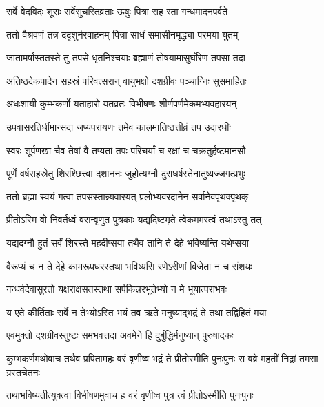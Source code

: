 \twolineshloka
{सर्वे वेदविदः शूराः सर्वेसुचरितव्रताः}
{ऊषुः पित्रा सह रता गन्धमादनपर्वते}


\twolineshloka
{ततो वैश्रवणं तत्र ददृशुर्नरवाहनम्}
{पित्रा सार्धं समासीनमृद्ध्या परमया युतम्}


\twolineshloka
{जातामर्षास्ततस्ते तु तपसे धृतनिश्चयाः}
{ब्रह्माणं तोषयामासुर्घोरेण तपसा तदा}


\twolineshloka
{अतिष्ठदेकपादेन सहस्रं परिवत्सरान्}
{वायुभक्षो दशग्रीवः पञ्चाग्निः सुसमाहितः}


\twolineshloka
{अधःशायी कुम्भकर्णो यताहारो यतव्रतः}
{विभीषणः शीर्णपर्णमेकमभ्यवहारयन्}


\twolineshloka
{उपवासरतिर्धीमान्सदा जप्यपरायणः}
{तमेव कालमातिष्ठत्तीव्रं तप उदारधीः}


\twolineshloka
{स्वरः शूर्पणखा चैव तेषां वै तप्यतां तपः}
{परिचर्यां च रक्षां च चक्रतुर्हष्टमानसौ}


\twolineshloka
{पूर्णे वर्षसहस्रेतु शिरश्छित्त्वा दशाननः}
{जुहोत्यग्नौ दुराधर्षस्तेनातुष्यज्जगत्प्रभुः}


\twolineshloka
{ततो ब्रह्मा स्वयं गत्वा तपसस्तान्न्यवारयत्}
{प्रलोभ्यवरदानेन सर्वानेवपृथक्पृथक्}



\twolineshloka
{प्रीतोऽस्मि वो निवर्तध्वं वरान्वृणुत पुत्रकाः}
{यद्यदिष्टमृते त्वेकममरत्वं तथाऽस्तु तत्}


\twolineshloka
{यद्यदग्नौ हुतं सर्वं शिरस्ते महदीप्सया}
{तथैव तानि ते देहे भविष्यन्ति यथेप्सया}


\twolineshloka
{वैरूप्यं च न ते देहे कामरूपधरस्तथा}
{भविष्यसि रणेऽरीणां विजेता न च संशयः}



\twolineshloka
{गन्धर्वदेवासुरतो यक्षराक्षसतस्तथा}
{सर्पकिन्नरभूतेभ्यो न मे भूयात्पराभवः}



\twolineshloka
{य एते कीर्तिताः सर्वे न तेभ्योऽस्ति भयं तव}
{ऋते मनुष्याद्भद्रं ते तथा तद्विहितं मया}



\twolineshloka
{एवमुक्तो दशग्रीवस्तुष्टः समभवत्तदा}
{अवमेने हि दुर्बुद्धिर्मनुष्यान् पुरुषादकः}


\threelineshloka
{कुम्भकर्णमथोवाच तथैव प्रपितामहः}
{वरं वृणीष्व भद्रं ते प्रीतोस्मीति पुनःपुनः}
{स वव्रे महतीं निद्रां तमसा ग्रस्तचेतनः}


\twolineshloka
{तथाभविष्यतीत्युक्त्वा विभीषणमुवाच ह}
{वरं वृणीष्व पुत्र त्वं प्रीतोऽस्मीति पुनःपुनः}

